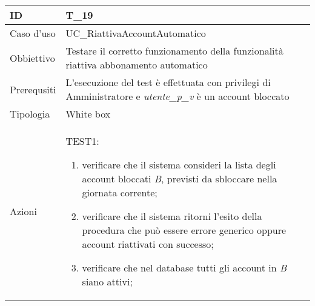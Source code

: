 \begin{table}[hb]
    \centering
    \begin{tabular}{ |p{2cm}|p{10cm}|  }
        \hline
        ID          & T\_19                                                                                                          \\\hline
        Caso d'uso  & UC\_RiattivaAccountAutomatico                                                                                  \\\hline
        Obbiettivo  & Testare il corretto funzionamento della funzionalità riattiva abbonamento automatico                           \\\hline
        Prerequsiti & L'esecuzione del test è effettuata con privilegi di Amministratore e \emph{utente\_p\_v} è un account bloccato \\\hline
        Tipologia   & White box                                                                                                      \\\hline
        Azioni      &
        TEST1:
        \begin{enumerate}[nosep, topsep=0pt]
            \item verificare che il sistema consideri la lista degli account bloccati \emph{B}, previsti da sbloccare nella giornata corrente;
            \item verificare che il sistema ritorni l'esito della procedura che può essere errore generico oppure account riattivati con successo;
            \item verificare che nel database tutti gli account in \emph{B} siano attivi;

        \end{enumerate}
        \\\hline
    \end{tabular}
\end{table}

